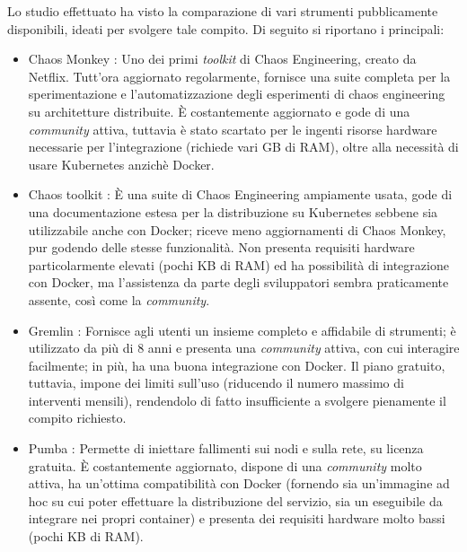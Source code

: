         Lo studio effettuato ha visto la comparazione di vari strumenti pubblicamente disponibili, ideati per svolgere tale compito. Di seguito si riportano i principali:
        \begin{itemize}
        
            \item Chaos Monkey \cite{Netflix}: Uno dei primi \textit{toolkit} di Chaos Engineering, creato da Netflix. Tutt’ora aggiornato regolarmente, fornisce una suite completa per la sperimentazione e l’automatizzazione degli esperimenti di chaos engineering su architetture distribuite. È costantemente aggiornato e gode di una \textit{community} attiva, tuttavia è stato scartato per le ingenti risorse hardware necessarie per l’integrazione (richiede vari GB di RAM), oltre alla necessità di usare Kubernetes anzichè Docker. 
            
            
            \item Chaos toolkit \cite{chaostoolkit}: È una suite di Chaos Engineering ampiamente usata, gode di una documentazione estesa per la distribuzione su Kubernetes sebbene sia utilizzabile anche con Docker; riceve meno aggiornamenti di Chaos Monkey, pur godendo delle stesse funzionalità. Non presenta requisiti hardware particolarmente elevati (pochi KB di RAM) ed ha possibilità di integrazione con Docker, ma l'assistenza da parte degli sviluppatori sembra praticamente assente, così come la \textit{community}. 
            
            \item Gremlin \cite{gremlin}: Fornisce agli utenti un insieme completo e affidabile di strumenti; è utilizzato da più di 8 anni e presenta una \textit{community} attiva, con cui interagire facilmente; in più, ha una buona integrazione con Docker. Il piano gratuito, tuttavia, impone dei limiti sull'uso (riducendo il numero massimo di interventi mensili), rendendolo di fatto insufficiente a svolgere pienamente il compito richiesto.
            
            
            \item Pumba \cite{pumba}: Permette di iniettare fallimenti sui nodi e sulla rete, su licenza gratuita. È costantemente aggiornato, dispone di una \textit{community} molto attiva, ha un'ottima compatibilità con Docker (fornendo sia un'immagine ad hoc su cui poter effettuare la distribuzione del servizio, sia un eseguibile da integrare nei propri container) e presenta dei requisiti hardware molto bassi (pochi KB di RAM).
            

\end{itemize}
